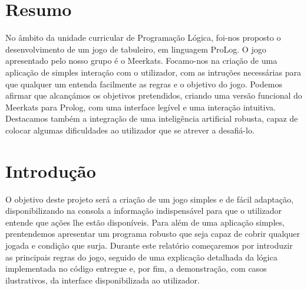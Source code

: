 \documentclass[a4paper]{article}
\begin{document}

\newpage

\section*{Resumo}
No âmbito da unidade curricular de Programação Lógica, foi-nos proposto o desenvolvimento de um jogo de tabuleiro, em linguagem ProLog.
O jogo apresentado pelo nosso grupo é o Meerkats. Focamo-nos na criação de uma aplicação de simples interação com o utilizador, com as intruções necessárias para que qualquer um entenda facilmente as regras e o objetivo do jogo.
Podemos afirmar que alcançámos os objetivos pretendidos, criando uma versão funcional do Meerkats para Prolog, com uma interface legível e uma interação intuitiva. Destacamos também a integração de uma inteligência artificial robusta, capaz de colocar algumas dificuldades ao utilizador que se atrever a desafiá-lo.

\newpage

\tableofcontents



\newpage

\section{Introdução}

O objetivo deste projeto será a criação de um jogo simples e de fácil adaptação, disponibilizando na consola a informação indispensável para que o utilizador entende que ações lhe estão disponíveis. Para além de uma aplicação simples, prentendemos apresentar um programa robusto que seja capaz de cobrir qualquer jogada e condição que surja.
Durante este relatório começaremos por introduzir as principais regras do jogo, seguido de uma explicação detalhada da lógica implementada no código entregue e, por fim, a demonstração, com casos ilustrativos, da interface disponibilizada ao utilizador.
\end{document}
